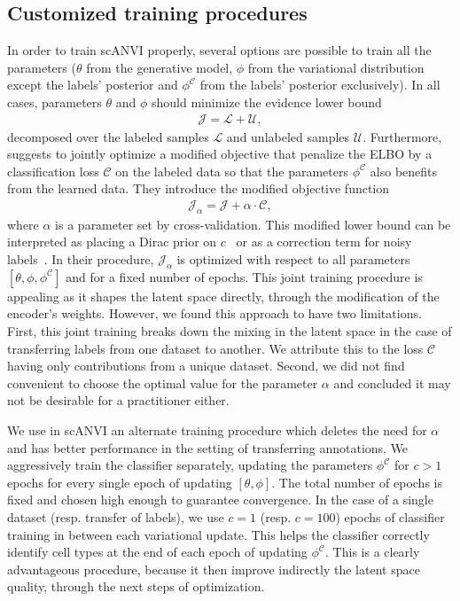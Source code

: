 \subsection{Customized training procedures}
In order to train scANVI properly, several options are possible to train all the parameters ($\theta$ from the generative model, $\phi$ from the variational distribution except the labels' posterior and $\phi^{\mathcal{C}}$ from the labels' posterior exclusively). In all cases, parameters $\theta$ and $\phi$ should minimize the evidence lower bound 
\begin{align}
    \mathcal{J} = \mathcal{L} + \mathcal{U},
\end{align}
decomposed over the labeled samples $\mathcal{L}$ and unlabeled samples $\mathcal{U}$. Furthermore,~\cite{m1m2} suggests to jointly optimize a modified objective that penalize the ELBO by a classification loss $\mathcal{C}$ on the labeled data so that the parameters $\phi^{\mathcal{C}}$ also benefits from the learned data. They introduce the modified objective function 
\begin{align}
\mathcal{J}_{\alpha} = \mathcal{J} + \alpha \cdot \mathcal{C},
\end{align}
where $\alpha$ is a parameter set by cross-validation. This modified lower bound can be interpreted as placing a Dirac prior on $c$~\cite{m1m2} or as a correction term for noisy labels~\cite{noisylabels}. In their procedure, $\mathcal{J}_\alpha$ is optimized with respect to all parameters $[\theta, \phi, \phi^{\mathcal{C}}]$ and for a fixed number of epochs. This joint training procedure is appealing as it shapes the latent space directly, through the modification of the encoder’s weights. However, we found this approach to have two limitations. First, this joint training breaks down the mixing in the latent space in the case of transferring labels from one dataset to another. We attribute this to the loss $\mathcal{C}$ having only contributions from a unique dataset. Second, we did not find convenient to choose the optimal value for the parameter $\alpha$ and concluded it may not be desirable for a practitioner either. 

We use in scANVI an alternate training procedure which deletes the need for $\alpha$ and has better performance in the setting of transferring annotations. We aggressively train the classifier separately, updating the parameters $\phi^\mathcal{C}$ for $c > 1$ epochs for every single epoch of updating $[\theta, \phi]$. The total number of epochs is fixed and chosen high enough to guarantee convergence. In the case of a single dataset (resp. transfer of labels), we use $c=1$ (resp. $c=100$) epochs of classifier training in between each variational update. This helps the classifier correctly identify cell types at the end of each epoch of updating $\phi^\mathcal{C}$. This is a clearly advantageous procedure, because it then improve indirectly the latent space quality, through the next steps of optimization. 




